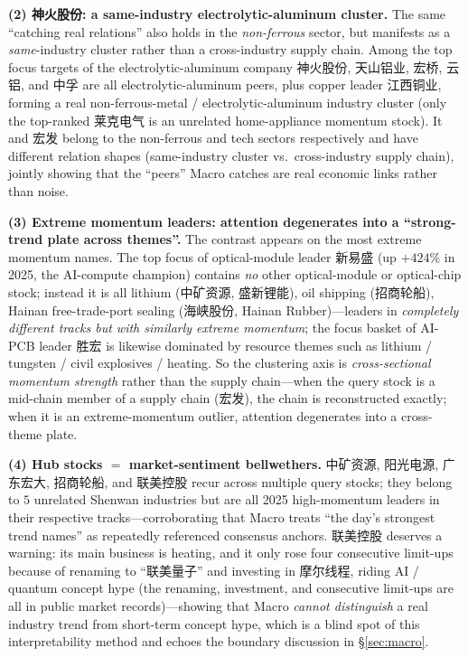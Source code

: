 \documentclass[a4paper,11pt]{article}
\begin{document}
\textbf{(2) 神火股份: a same-industry electrolytic-aluminum cluster.} The
same ``catching real relations'' also holds in the \emph{non-ferrous} sector,
but manifests as a \emph{same}-industry cluster rather than a cross-industry
supply chain. Among the top focus targets of the electrolytic-aluminum company
神火股份, 天山铝业, 宏桥, 云铝, and 中孚 are all
electrolytic-aluminum peers, plus copper leader 江西铜业, forming a real
non-ferrous-metal / electrolytic-aluminum industry cluster (only the top-ranked
莱克电气 is an unrelated home-appliance momentum stock). It and
宏发 belong to the non-ferrous and tech sectors respectively and have
different relation shapes (same-industry cluster vs.\ cross-industry supply
chain), jointly showing that the ``peers'' Macro catches are real economic
links rather than noise.

\textbf{(3) Extreme momentum leaders: attention degenerates into a
``strong-trend plate across themes''.} The contrast appears on the most extreme
momentum names. The top focus of optical-module leader 新易盛 (up $+424\%$
in 2025, the AI-compute champion) contains \emph{no} other optical-module or
optical-chip stock; instead it is all lithium (中矿资源, 盛新锂能), oil shipping (招商轮船), Hainan free-trade-port sealing (海峡股份, Hainan
Rubber)---leaders in \emph{completely different tracks but with similarly
extreme momentum}; the focus basket of AI-PCB leader 胜宏 is likewise
dominated by resource themes such as lithium / tungsten / civil explosives /
heating. So the clustering axis is \emph{cross-sectional momentum strength}
rather than the supply chain---when the query stock is a mid-chain member of a
supply chain (宏发), the chain is reconstructed exactly; when it is an
extreme-momentum outlier, attention degenerates into a cross-theme plate.

\textbf{(4) Hub stocks $=$ market-sentiment bellwethers.} 中矿资源,
阳光电源, 广东宏大, 招商轮船, and 联美控股 recur across multiple
query stocks; they belong to $5$ unrelated Shenwan industries but are all
2025 high-momentum leaders in their respective tracks---corroborating that
Macro treats ``the day's strongest trend names'' as repeatedly referenced
consensus anchors. 联美控股 deserves a warning: its main business is
heating, and it only rose four consecutive limit-ups because of renaming to
``联美量子'' and investing in 摩尔线程, riding AI / quantum
concept hype (the renaming, investment, and consecutive limit-ups are all in
public market records)---showing that Macro \emph{cannot distinguish} a real
industry trend from short-term concept hype, which is a blind spot of this
interpretability method and echoes the boundary discussion in
\S\ref{sec:macro}.
\end{document}
